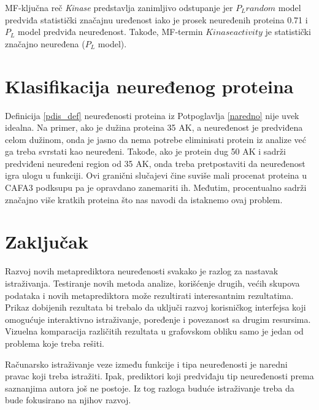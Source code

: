 MF-ključna reč \textit{Kinase} predstavlja zanimljivo odstupanje jer $P_L
random$ model predviđa statistički značajnu uređenost iako je prosek neuređenih
proteina 0.71 i $P_L$ model predviđa neuređenost. Takođe, MF-termin $Kinase
activity$ je statistički značajno neuređena ($P_L$ model).

\section{Klasifikacija neuređenog proteina}

Definicija \ref{pdis_def} neuređenosti proteina iz Potpoglavlja
\ref{naredno} nije uvek idealna.  Na primer, ako je dužina proteina 35 AK, a
neuređenost je predviđena celom dužinom, onda je jasno da nema potrebe eliminisati
protein iz analize već ga treba svrstati kao neuređeni.  Takođe, ako je protein
dug 50 AK i sadrži predviđeni neuređeni region od 35 AK, onda treba
pretpostaviti da neuređenost igra ulogu u funkciji. Ovi granični slučajevi čine
suviše mali procenat proteina u CAFA3 podksupu pa je opravdano zanemariti ih.
Međutim, procentualno \swissprot sadrži značajno više kratkih proteina što nas
navodi da istaknemo ovaj problem.

\section{Zaključak}

Razvoj novih metaprediktora neuređenosti \cite{Meng_c2017} svakako je razlog za
nastavak istraživanja. Testiranje novih metoda analize, korišćenje drugih,
većih skupova podataka i novih metaprediktora može rezultirati interesantnim
rezultatima. Prikaz dobijenih rezultata bi trebalo da uključi razvoj
korisničkog interfejsa koji omogućuje interaktivno istraživanje, poređenje i
povezanost sa drugim resursima. Vizuelna komparacija različitih rezultata u
grafovskom obliku samo je jedan od problema koje treba rešiti.

Računarsko istraživanje veze između funkcije i tipa neuređenosti je naredni
pravac koji treba istražiti. Ipak, prediktori koji predviđaju tip neuređenosti
prema saznanjima autora još ne postoje. Iz tog razloga buduće istraživanje
treba da bude fokusirano na njihov razvoj.


